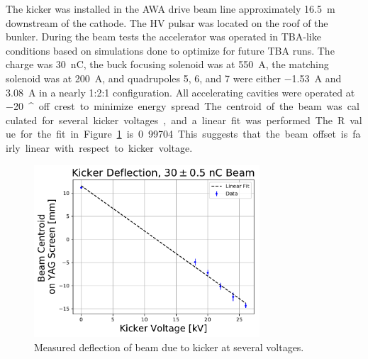The kicker was installed in the AWA drive beam line approximately \SI{16.5}{m} downstream of the cathode.
The HV pulsar was located on the roof of the bunker.
During the beam tests the accelerator was operated in TBA-like conditions based on simulations 
done to optimize for future TBA runs.
The charge was \SI{30}{nC}, the buck focusing solenoid was at \SI{550}{A}, the matching solenoid was at \SI{200}{A}, 
and quadrupoles 5, 6, and 7 were either \SI{-1.53}{A} and \SI{3.08}{A} in a nearly 1:2:1 configuration.
All accelerating cavities were operated at \SI{-20}{^\circ} off crest to minimize energy spread.
The centroid of the beam was calculated for several kicker voltages, and a linear fit was performed.
The R value for the fit in Figure \ref{fig:linear} is 0.99704. This suggests that the beam offset 
is fairly linear with respect to kicker voltage. 
\begin{figure}
	\centering
	\includegraphics[width=0.75\textwidth]{./images/kicker_linearity}
	\caption{Measured deflection of beam due to kicker at several voltages.}
	\label{fig:linear}
\end{figure}

